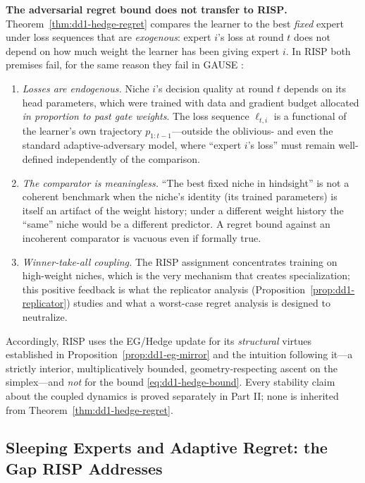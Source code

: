 \documentclass[11pt,a4paper]{article}
\theoremstyle{definition}
\theoremstyle{plain}
\newcommand{\nm}{\textsc{RISP}}
\begin{document}
\begin{warning}
\textbf{The adversarial regret bound does not transfer to \nm{}.}
Theorem~\ref{thm:dd1-hedge-regret} compares the learner to the best
\emph{fixed} expert under loss sequences that are \emph{exogenous}: expert
$i$'s loss at round $t$ does not depend on how much weight the learner has
been giving expert $i$. In \nm{} both premises fail, for the same reason they
fail in GAUSE \cite{li2026gause}:
\begin{enumerate}
\item \emph{Losses are endogenous.} Niche $i$'s decision quality at round $t$
depends on its head parameters, which were trained with data and gradient
budget allocated \emph{in proportion to past gate weights}. The loss sequence
$\ell_{t,i}$ is a functional of the learner's own trajectory
$p_{1:t-1}$---outside the oblivious- and even the standard adaptive-adversary
model, where ``expert $i$'s loss'' must remain well-defined independently of
the comparison.
\item \emph{The comparator is meaningless.} ``The best fixed niche in
hindsight'' is not a coherent benchmark when the niche's identity (its
trained parameters) is itself an artifact of the weight history; under a
different weight history the ``same'' niche would be a different predictor.
A regret bound against an incoherent comparator is vacuous even if formally
true.
\item \emph{Winner-take-all coupling.} The \nm{} assignment concentrates
training on high-weight niches, which is the very mechanism that creates
specialization; this positive feedback is what the replicator analysis
(Proposition~\ref{prop:dd1-replicator}) studies and what a worst-case regret
analysis is designed to neutralize.
\end{enumerate}
Accordingly, \nm{} uses the EG/Hedge update for its \emph{structural}
virtues established in Proposition~\ref{prop:dd1-eg-mirror} and the
intuition following it---a strictly interior, multiplicatively bounded,
geometry-respecting ascent on the simplex---and \emph{not} for the bound
\eqref{eq:dd1-hedge-bound}. Every stability claim about the coupled dynamics
is proved separately in Part II; none is inherited from
Theorem~\ref{thm:dd1-hedge-regret}.
\end{warning}

\subsection{Sleeping Experts and Adaptive Regret: the Gap \nm{} Addresses}
\label{sec:dd1-sleeping}
\end{document}
